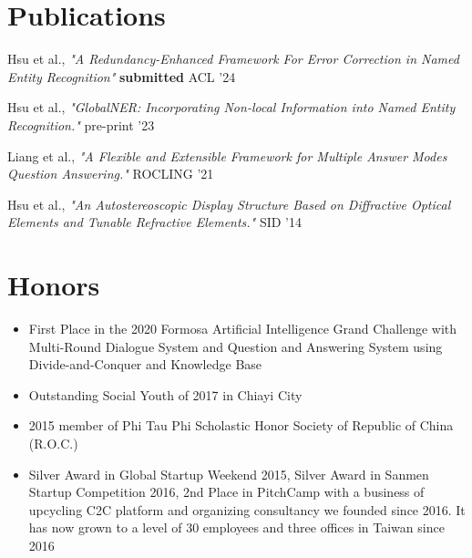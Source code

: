\documentclass[letterpaper,11pt]{article}
\newcommand{\arabicListStart}{\begin{enumerate}[label={\textbf{[\arabic*]}}]}
\newcommand{\arabicListEnd}{\end{enumerate}\vspace{-5pt}}
\newcommand{\bulletedListStart}{\begin{itemize}[]}
\newcommand{\bulletedListEnd}{\end{itemize}\vspace{-5pt}}
\newcommand{\simpleItem}[1]{
  \item\small{
    {#1 \vspace{-9pt}}
  }
}
\begin{document}


\section{Publications}
    \arabicListStart
      \simpleItem
          {Hsu et al., \textit{"A Redundancy-Enhanced Framework For Error Correction in Named Entity Recognition"} \textbf{submitted} ACL '24}\label{pub:recovery}
      \simpleItem
          {Hsu et al., \textit{"GlobalNER: Incorporating Non-local Information into Named Entity Recognition."} pre-print '23}\label{pub:globalner}
      \simpleItem
          {Liang et al., \textit{"A Flexible and Extensible Framework for Multiple Answer Modes Question Answering."} ROCLING '21}\label{pub:qa}
      \simpleItem
          {Hsu et al., \textit{"An Autostereoscopic Display Structure Based on Diffractive Optical Elements and Tunable Refractive Elements."} SID '14}\label{pub:sid}

    \arabicListEnd

\section{Honors}
    \bulletedListStart
      \simpleItem
        {First Place in the 2020 Formosa Artificial Intelligence Grand Challenge with Multi-Round Dialogue System and Question and Answering System using Divide-and-Conquer and Knowledge Base}
      \simpleItem
        {Outstanding Social Youth of 2017 in Chiayi City}
      \simpleItem
         {2015 member of Phi Tau Phi Scholastic Honor Society of Republic of China (R.O.C.)}
      \simpleItem
         {Silver Award in Global Startup Weekend 2015, Silver Award in Sanmen Startup Competition 2016, 2nd Place in PitchCamp with a business of upcycling C2C platform and organizing consultancy we founded since 2016. It has now grown to a level of 30 employees and three offices in Taiwan since 2016}
    \bulletedListEnd
    
\end{document}
